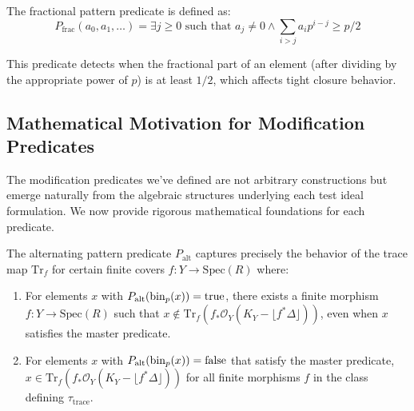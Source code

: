 \begin{definition}\label{def:fractional-pattern}
The fractional pattern predicate is defined as:
$$P_{\text{frac}}(a_0, a_1, \ldots) = \exists j \geq 0 \text{ such that } a_j \neq 0 \wedge \sum_{i>j} a_i p^{i-j} \geq p/2$$

This predicate detects when the fractional part of an element (after dividing by the appropriate power of $p$) is at least $1/2$, which affects tight closure behavior.
\end{definition}

\subsection{Mathematical Motivation for Modification Predicates}

The modification predicates we've defined are not arbitrary constructions but emerge naturally from the algebraic structures underlying each test ideal formulation. We now provide rigorous mathematical foundations for each predicate.

\begin{theorem}\label{thm:trace-predicate-motivation}
The alternating pattern predicate $P_{\text{alt}}$ captures precisely the behavior of the trace map $\text{Tr}_f$ for certain finite covers $f: Y \to \text{Spec}(R)$ where:

\begin{enumerate}
    \item For elements $x$ with $P_{\text{alt}}(\operatorname{bin}_p(x)) = \text{true}$, there exists a finite morphism $f: Y \to \text{Spec}(R)$ such that $x \notin \text{Tr}_f(f_*\mathcal{O}_Y(K_Y - \lfloor f^*\Delta\rfloor))$, even when $x$ satisfies the master predicate.
    
    \item For elements $x$ with $P_{\text{alt}}(\operatorname{bin}_p(x)) = \text{false}$ that satisfy the master predicate, $x \in \text{Tr}_f(f_*\mathcal{O}_Y(K_Y - \lfloor f^*\Delta\rfloor))$ for all finite morphisms $f$ in the class defining $\tau_{\text{trace}}$.
\end{enumerate}
\end{theorem}

